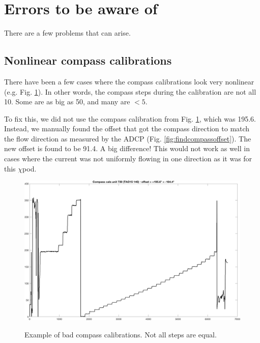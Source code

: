 \documentclass[12pt]{article}
\begin{document}
\section{Errors to be aware of}

There are a few problems that can arise.

\subsection{Nonlinear compass calibrations}
There have been a few cases where the compass calibrations look very nonlinear (e.g. Fig. \ref{fig:badcals}). In other words, the compass steps during the calibration are not all 10\degree. Some are as big as 50\degree, and many are $<5$\degree. 

To fix this, we did not use the compass calibration from Fig. \ref{fig:badcals}, which was 195.6\degree. Instead, we manually found the offset that got the compass direction to match the flow direction as measured by the ADCP (Fig. \ref{fig:findcompassoffset}). The new offset is found to be 91.4\degree. A big difference! This would not work as well in cases where the current was not uniformly flowing in one direction as it was for this $\chi$pod.

\begin{figure}[h]
  \centering \centering\noindent\includegraphics[width=12.5cm,angle=0]{./figs/compass_cals_730.png}\\
    \caption{Example of bad compass calibrations. Not all steps are equal.}\label{fig:badcals}
\end{figure}
\end{document}
